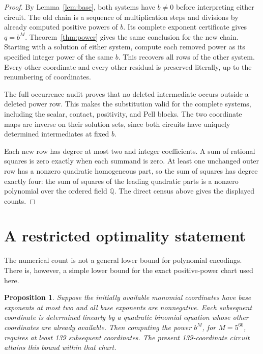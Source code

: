 \documentclass[11pt]{article}
\newtheorem{proposition}[theorem]{Proposition}
\newcommand{\Q}{\mathbb Q}
\begin{document}
\begin{proof}
By Lemma~\ref{lem:base}, both systems have $b\ne0$ before interpreting
either circuit.  The old chain is a sequence of multiplication steps
and divisions by already computed positive powers of $b$.  Its complete
exponent certificate gives $q=b^M$.  Theorem~\ref{thm:power} gives the
same conclusion for the new chain.  Starting with a solution of either
system, compute each removed power as its specified integer power of
the same $b$.  This recovers all rows of the other system.  Every other
coordinate and every other residual is preserved literally, up to the
renumbering of coordinates.

The full occurrence audit proves that no deleted intermediate occurs
outside a deleted power row.  This makes the substitution valid for the
complete systems, including the scalar, contact, positivity, and Pell
blocks.  The two coordinate maps are inverse on their solution sets,
since both circuits have uniquely determined intermediates at fixed $b$.

Each new row has degree at most two and integer coefficients.  A sum
of rational squares is zero exactly when each summand is zero.  At least
one unchanged outer row has a nonzero quadratic homogeneous part, so the
sum of squares has degree exactly four: the sum of squares of the leading
quadratic parts is a nonzero polynomial over the ordered field $\Q$.
The direct census above gives the displayed counts.
\end{proof}

\section{A restricted optimality statement}

The numerical count is not a general lower bound for polynomial
encodings.  There is, however, a simple lower bound for the exact
positive-power chart used here.

\begin{proposition}
Suppose the initially available monomial coordinates have base
exponents at most two and all base exponents are nonnegative.
Each subsequent coordinate is determined linearly by a quadratic
binomial equation whose other coordinates are already available.
Then computing the power $b^M$, for $M=5^{60}$, requires at least
139 subsequent coordinates.  The present 139-coordinate circuit
attains this bound within that chart.
\end{proposition}
\end{document}
